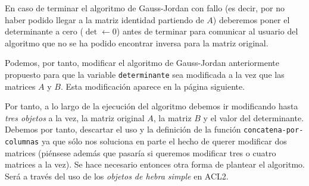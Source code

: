 \documentclass[a4paper,10pt]{article}
\begin{document}
En caso de terminar el algoritmo de Gauss-Jordan con fallo (es decir, por no haber podido llegar a la matriz identidad partiendo de $A$) deberemos poner el determinante a cero ($\det \leftarrow 0$) antes de terminar para comunicar al usuario del algoritmo que no se ha podido encontrar inversa para la matriz original.

\par \vspace{10pt}

Podemos, por tanto, modificar el algoritmo de Gauss-Jordan anteriormente propuesto para que la variable \texttt{determinante} sea modificada a la vez que las matrices $A$ y $B$. Esta modificación aparece en la página siguiente.

\par \vspace{10pt}

Por tanto, a lo largo de la ejecución del algoritmo debemos ir modificando hasta \emph{tres objetos} a la vez, la matriz original $A$, la matriz $B$ y el valor del determinante. Debemos por tanto, descartar el uso y la definición de la función \texttt{concatena-por-columnas} ya que sólo nos soluciona en parte el hecho de querer modificar dos matrices (piénsese además que pasaría si queremos modificar tres o cuatro matrices a la vez). Se hace necesario entonces otra forma de plantear el algoritmo. Será a través del uso de los \emph{objetos de hebra simple} en ACL2.
\end{document}
